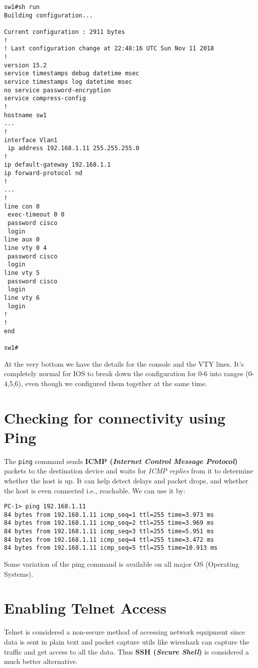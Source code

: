 \vspace{-15pt}
\begin{verbatim}
sw1#sh run
Building configuration...

Current configuration : 2911 bytes
!
! Last configuration change at 22:48:16 UTC Sun Nov 11 2018
!
version 15.2
service timestamps debug datetime msec
service timestamps log datetime msec
no service password-encryption
service compress-config
!
hostname sw1
...
!
interface Vlan1
 ip address 192.168.1.11 255.255.255.0
!
ip default-gateway 192.168.1.1
ip forward-protocol nd
!
...
!
line con 0
 exec-timeout 0 0
 password cisco
 login
line aux 0
line vty 0 4
 password cisco
 login
line vty 5
 password cisco
 login
line vty 6
 login
!
!
end

sw1#
\end{verbatim}
\vspace{-10pt}

\noindent
At the very bottom we have the details for the console and the VTY lines. It's completely normal for IOS to break down the configuration for 0-6 into ranges (0-4,5,6), even though we configured them together at the same time. 

\section{Checking for connectivity using Ping}
The \verb|ping| command sends \textbf{ICMP (\textit{Internet Control Message Protocol})} packets to the destination device and waits for \textit{ICMP replies} from it to determine whether the host is up. It can help detect delays and packet drops, and whether the host is even connected i.e., reachable. We can use it by:

\vspace{-15pt}
\begin{verbatim}
PC-1> ping 192.168.1.11
84 bytes from 192.168.1.11 icmp_seq=1 ttl=255 time=3.973 ms
84 bytes from 192.168.1.11 icmp_seq=2 ttl=255 time=3.969 ms
84 bytes from 192.168.1.11 icmp_seq=3 ttl=255 time=5.951 ms
84 bytes from 192.168.1.11 icmp_seq=4 ttl=255 time=3.472 ms
84 bytes from 192.168.1.11 icmp_seq=5 ttl=255 time=10.913 ms
\end{verbatim}
\vspace{-10pt}

\noindent
Some variation of the ping command is available on all major OS (Operating Systems). 

\section{Enabling Telnet Access}
Telnet is considered a non-secure method of accessing network equipment since data is sent in plain text and packet capture utils like wireshark can capture the traffic and get access to all the data. Thus \textbf{SSH (\textit{Secure Shell})} is considered a much better alternative. 

